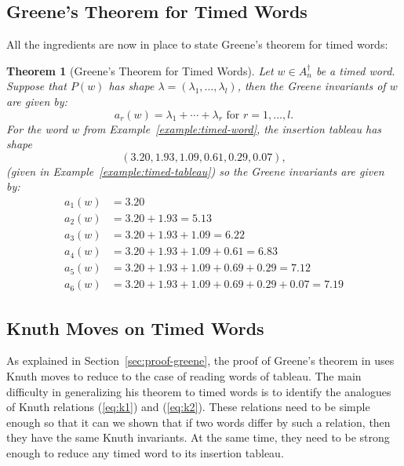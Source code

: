 \documentclass[10pt]{amsproc}
\newtheorem{theorem}{Theorem}[subsection]
\theoremstyle{definition}
\theoremstyle{remark}
\begin{document}
\subsection{Greene's Theorem for Timed Words}
\label{sec:greene-theorem-timed}
All the ingredients are now in place to state Greene's theorem for timed words:
\begin{theorem}
  [Greene's Theorem for Timed Words]
  \label{theorem:Greeene-timed}
  Let $w\in A_n^\dagger$ be a timed word.
  Suppose that $P(w)$ has shape $\lambda=(\lambda_1,\dotsc,\lambda_l)$, then the Greene invariants of $w$ are given by:
  \begin{displaymath}
    a_r(w) = \lambda_1+\dotsb + \lambda_r \text{ for } r=1,\dotsc,l.
  \end{displaymath}
  For the word $w$ from Example~\ref{example:timed-word}, the insertion tableau has shape
  \begin{displaymath}
    (3.20, 1.93, 1.09, 0.61, 0.29, 0.07),
  \end{displaymath}
  (given in Example~\ref{example:timed-tableau}) so the Greene invariants are given by:
  \begin{align*}
    a_1(w) & = 3.20\\
    a_2(w) & = 3.20+1.93=5.13\\
    a_3(w) & = 3.20+1.93+1.09=6.22\\
    a_4(w) & = 3.20+1.93+1.09+0.61=6.83\\
    a_5(w) & = 3.20+1.93+1.09+0.69+0.29=7.12\\
    a_6(w) & = 3.20+1.93+1.09+0.69+0.29+0.07=7.19
  \end{align*}
\end{theorem}
\subsection{Knuth Moves on Timed Words}
\label{sec:knuth-moves-timed}
As explained in Section~\ref{sec:proof-greene}, the proof of Greene's theorem in \cite{Greene-schen} uses Knuth moves to reduce to the case of reading words of tableau.
The main difficulty in generalizing his theorem to timed words is to identify the analogues of Knuth relations (\ref{eq:k1}) and (\ref{eq:k2}).
These relations need to be simple enough so that it can we shown that if two words differ by such a relation, then they have the same Knuth invariants.
At the same time, they need to be strong enough to reduce any timed word to its insertion tableau.
\end{document}
